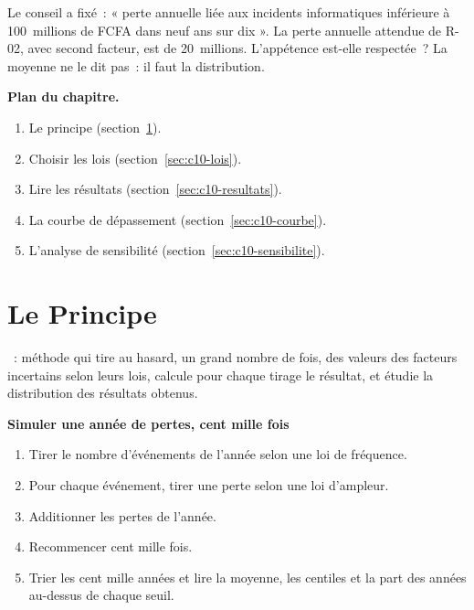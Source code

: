 Le conseil a fixé~: « perte annuelle liée aux incidents informatiques
inférieure à 100~millions de FCFA dans neuf ans sur dix ». La perte
annuelle attendue de R-02, avec second facteur, est de 20~millions.
L'appétence est-elle respectée~? La moyenne ne le dit pas~: il faut la
distribution.

\medskip
\textbf{Plan du chapitre.}
\begin{enumerate}
    \item Le principe (section~\ref{sec:c10-principe}).
    \item Choisir les lois (section~\ref{sec:c10-lois}).
    \item Lire les résultats (section~\ref{sec:c10-resultats}).
    \item La courbe de dépassement (section~\ref{sec:c10-courbe}).
    \item L'analyse de sensibilité (section~\ref{sec:c10-sensibilite}).
\end{enumerate}

\separateur

\section{Le Principe}
\label{sec:c10-principe}

\begin{boxdef}
~: méthode qui tire au hasard, un
grand nombre de fois, des valeurs des facteurs incertains selon leurs lois,
calcule pour chaque tirage le résultat, et étudie la distribution des
résultats obtenus.
\end{boxdef}

\begin{boxprocedure}
\textbf{Simuler une année de pertes, cent mille fois}
\begin{enumerate}
    \item Tirer le nombre d'événements de l'année selon une loi de
          fréquence.
    \item Pour chaque événement, tirer une perte selon une loi d'ampleur.
    \item Additionner les pertes de l'année.
    \item Recommencer cent mille fois.
    \item Trier les cent mille années et lire la moyenne, les centiles et
          la part des années au-dessus de chaque seuil.
\end{enumerate}
\end{boxprocedure}

